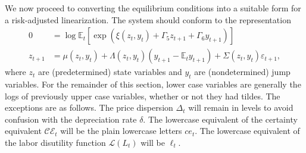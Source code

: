 \documentclass[12 pt, oneside]{article}
\theoremstyle{definition}
\theoremstyle{definition}
\theoremstyle{definition}
\newcommand{\E}{\mathbb{E}}
\newcommand{\calC}{\mathcal{C}}
\newcommand{\calE}{\mathcal{E}}
\newcommand{\calL}{\mathcal{L}}
\begin{document}
We now proceed to converting the equilibrium conditions into a suitable form for a risk-adjusted linearization. The system should conform to the representation
\begin{align*}
  0 & = \log \E_t\left[\exp\left(\xi(z_t, y_t) + \Gamma_5 z_{t + 1} + \Gamma_6 y_{t + 1}\right)\right]\\
  z_{t + 1} & = \mu(z_t, y_t) + \Lambda(z_t, y_t) (y_{t + 1} - \E_t y_{t + 1}) + \Sigma(z_t, y_t) \varepsilon_{t + 1},
\end{align*}
where $z_t$ are (predetermined) state variables and $y_t$ are (nondetermined) jump variables.
For the remainder of this section, lower case variables are generally the logs of previously upper case variables, whether or not they had tildes. The exceptions are as follows. The price dispersion $\Delta_t$ will remain in levels to avoid confusion with the depreciation rate $\delta$. The lowercase equivalent of the certainty equivalent $\calC\calE_t$ will be the plain lowercase letters $ce_t$. The lowercase equivalent of the labor disutility function $\calL(L_t)$ will be $\ell_t$.
\end{document}

